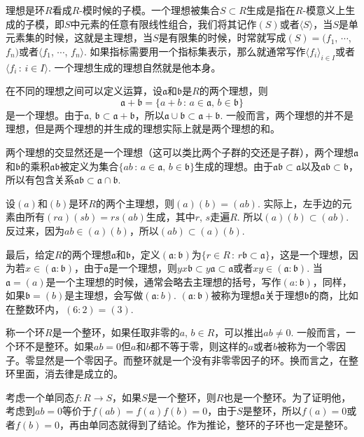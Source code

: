 \para 理想是环$R$看成$R$-模时候的子模。一个理想被集合$S\subset R$生成是指在$R$-模意义上生成的子模，即$S$中元素的任意有限线性组合，我们将其记作$(S)$或者$\langle S\rangle$，当$S$是单元素集的时候，这就是主理想，当$S$是有限集的时候，时常就写成$(S)=(f_1$, $\cdots$, $f_n)$或者$\langle f_1$, $\cdots$, $f_n\rangle$. 如果指标需要用一个指标集表示，那么就通常写作$\langle f_i\rangle_{i\in I}$或者$\langle f_i\,:\,i\in I\rangle$. 一个理想生成的理想自然就是他本身。

\para 在不同的理想之间可以定义运算，设$\mathfrak{a}$和$\mathfrak{b}$是$R$的两个理想，则
\[\mathfrak{a}+\mathfrak{b}=\{a+b\,:\,a\in\mathfrak{a},\,b\in\mathfrak{b}\}
\]
是一个理想。由于$\mathfrak{a}$, $\mathfrak{b}\subset \mathfrak{a}+\mathfrak{b}$，所以$\mathfrak{a}\cup\mathfrak{b}\subset \mathfrak{a}+\mathfrak{b}$. 一般而言，两个理想的并不是理想，但是两个理想的并生成的理想实际上就是两个理想的和。

两个理想的交显然还是一个理想（这可以类比两个子群的交还是子群），两个理想$\mathfrak{a}$和$\mathfrak{b}$的乘积$\mathfrak{a}\mathfrak{b}$被定义为集合$\{ab\,:\,a\in\mathfrak{a},\,b\in\mathfrak{b}\}$生成的理想。由于$\mathfrak{a}\mathfrak{b}\subset \mathfrak{a}$以及$\mathfrak{a}\mathfrak{b}\subset \mathfrak{b}$，所以有包含关系$\mathfrak{a}\mathfrak{b}\subset \mathfrak{a}\cap \mathfrak{b}$.

设$(a)$和$(b)$是环$R$的两个主理想，则$(a)(b)=(ab)$. 实际上，左手边的元素由所有$(ra)(sb)=rs(ab)$生成，其中$r$, $s$走遍$R$. 所以$(a)(b)\subset (ab)$. 反过来，因为$ab\in (a)(b)$，所以$(ab)\subset (a)(b)$.

最后，给定$R$的两个理想$\mathfrak{a}$和$\mathfrak{b}$，定义$(\mathfrak{a}:\mathfrak{b})$为$\{r\in R\,:\, r\mathfrak{b}\subset \mathfrak{a}\}$，这是一个理想，因为若$x\in (\mathfrak{a}:\mathfrak{b})$，由于$\mathfrak{a}$是一个理想，则$yx\mathfrak{b}\subset y\mathfrak{a}\subset \mathfrak{a}$或者$xy\in (\mathfrak{a}:\mathfrak{b})$. 当$\mathfrak{a}=(a)$是一个主理想的时候，通常会略去主理想的括号，写作$(a:\mathfrak{b})$，同样，如果$\mathfrak{b}=(b)$是主理想，会写做$(\mathfrak{a}:b)$. $(\mathfrak{a}:\mathfrak{b})$被称为理想$\mathfrak{a}$关于理想$\mathfrak{b}$的商，比如在整数环内，$(6:2)=(3)$.

\para 称一个环$R$是一个整环，如果任取非零的$a$, $b\in R$，可以推出$ab\neq 0$. 一般而言，一个环不是整环。如果$ab=0$但$a$和$b$都不等于零，则这样的$a$或者$b$被称为一个零因子。零显然是一个零因子。而整环就是一个没有非零零因子的环。换而言之，在整环里面，消去律是成立的。

考虑一个单同态$f:R\to S$，如果$S$是一个整环，则$R$也是一个整环。为了证明他，考虑到$ab=0$等价于$f(ab)=f(a)f(b)=0$，由于$S$是整环，所以$f(a)=0$或者$f(b)=0$，再由单同态就得到了结论。作为推论，整环的子环也一定是整环。

